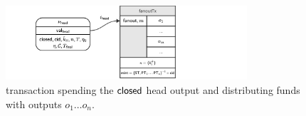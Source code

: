 \begin{figure}[h]
	\centering
	\includegraphics[width=0.8\textwidth]{figures/fanoutTx.pdf}
	\caption{\mtxFanout{} transaction spending the $\mathsf{closed}$ head output and
		distributing funds with outputs $o_{1} \dots o_{n}$.}\label{fig:fanoutTx}
\end{figure}

\FloatBarrier{}

